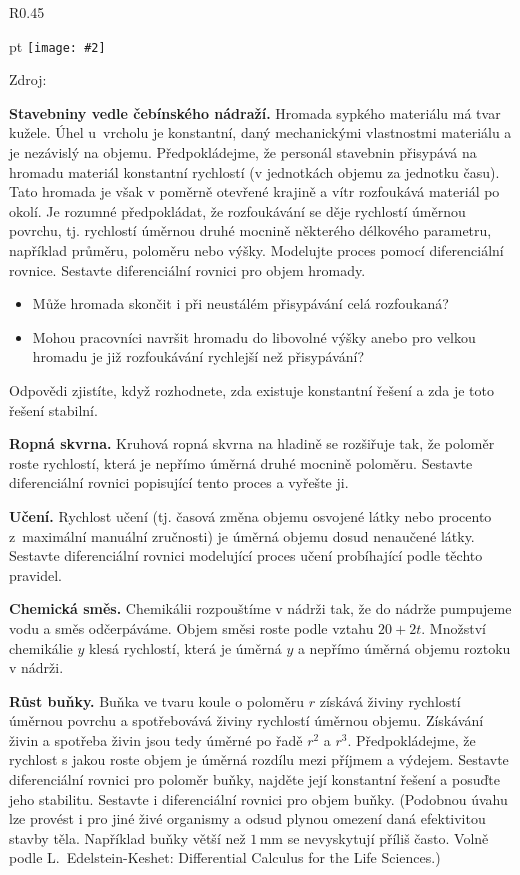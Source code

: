 \documentclass{article}
\def\zlomek{0.45}
\def\nic{}
\newcommand\obrazek[2][pixabay.com]{
  \clearpage
  \def\test{#1}
\begin{wrapfigure}{R}{\zlomek\linewidth}
  \begin{minipage}{1.0\linewidth}\parskip 0 pt
  \texttt{[image: \#2]}

  \vspace*{-10pt}
  \ifx\test\nic\else
  \null\hfill{\color{gray}\footnotesize Zdroj: #1}
  \fi

  \mezera
  \end{minipage}
\end{wrapfigure}
}
\let\oldtextbf\textbf
\def\textbf#1{%
  \oldtextbf{\color{red} #1}}
\def\mezera{\vspace*{10pt}}
\begin{document}
\newpage

\obrazek[]{pokros.jpg}


\textbf{Stavebniny vedle čebínského nádraží.} Hromada sypkého
materiálu má tvar kužele. Úhel u~vrcholu je konstantní, daný
mechanickými vlastnostmi materiálu a je nezávislý na
objemu. Předpokládejme, že personál stavebnin přisypává na hromadu
materiál konstantní rychlostí (v jednotkách objemu za jednotku
času). Tato hromada je však v poměrně otevřené krajině a vítr
rozfoukává materiál po okolí. Je rozumné předpokládat, že rozfoukávání
se děje rychlostí úměrnou povrchu, tj. rychlostí úměrnou druhé mocnině
některého délkového parametru, například průměru, poloměru nebo
výšky. Modelujte proces pomocí diferenciální rovnice. Sestavte
diferenciální rovnici pro objem hromady.
\begin{itemize}
 pt
\item Může hromada skončit i při neustálém přisypávání celá rozfoukaná?
\item Mohou pracovníci navršit hromadu do libovolné výšky anebo pro velkou hromadu je již rozfoukávání rychlejší než přisypávání?
\end{itemize}
Odpovědi zjistíte, když
rozhodnete, zda existuje konstantní řešení a zda je toto řešení
stabilní.



\newpage

\textbf{Ropná skvrna.} Kruhová ropná skvrna na hladině se rozšiřuje
tak, že poloměr roste rychlostí, která je nepřímo úměrná druhé mocnině
poloměru. Sestavte diferenciální rovnici popisující tento proces a
vyřešte ji.

\textbf{Učení.} Rychlost učení (tj. časová změna objemu osvojené látky
nebo procento z~maximální manuální zručnosti) je úměrná objemu dosud
nenaučené látky. Sestavte diferenciální rovnici modelující proces
učení probíhající podle těchto pravidel.


\textbf{Chemická směs.} Chemikálii rozpouštíme v nádrži tak, že do
nádrže pumpujeme vodu a směs odčerpáváme. Objem směsi roste podle
vztahu $20+2t$. Množství chemikálie $y$ klesá rychlostí, která je
úměrná $y$ a nepřímo úměrná objemu roztoku v nádrži.


\textbf{Růst buňky.} Buňka ve tvaru koule o poloměru $r$ získává
živiny rychlostí úměrnou povrchu a spotřebovává živiny rychlostí
úměrnou objemu. Získávání živin a spotřeba živin jsou tedy úměrné po
řadě $r^2$ a $r^3$. Předpokládejme, že rychlost s jakou roste objem je
úměrná rozdílu mezi příjmem a výdejem. Sestavte diferenciální rovnici
pro poloměr buňky, najděte její konstantní řešení a posuďte jeho
stabilitu. Sestavte i diferenciální rovnici pro objem buňky. (Podobnou
úvahu lze provést i pro jiné živé organismy a odsud plynou omezení
daná efektivitou stavby těla. Například buňky větší než
$1\,\mathrm{mm}$ se nevyskytují příliš často. Volně podle
L.~Edelstein-Keshet: Differential Calculus for the Life Sciences.)
\end{document}
